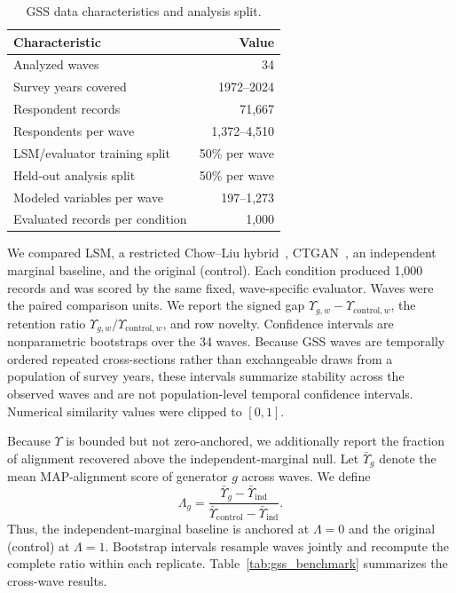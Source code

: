 \documentclass[runningheads]{llncs}
\begin{document}
\begin{table}[t]
\centering
\caption{GSS data characteristics and analysis split.}
\label{tab:gss_data}
\small
\setlength{\tabcolsep}{3.5pt}
\begin{tabular}{@{}lr@{}}
\toprule
Characteristic & Value \\
\midrule
Analyzed waves & 34 \\
Survey years covered & 1972--2024 \\
Respondent records & 71,667 \\
Respondents per wave & 1,372--4,510 \\
LSM/evaluator training split & 50\% per wave \\
Held-out analysis split & 50\% per wave \\
Modeled variables per wave & 197--1,273 \\
Evaluated records per condition & 1,000 \\
\bottomrule
\end{tabular}
\end{table}

We compared LSM, a restricted Chow--Liu hybrid~\cite{chow1968},
CTGAN~\cite{xu2019ctgan}, an independent marginal baseline, and the original
(control). Each condition produced 1,000 records and
was scored by the same fixed, wave-specific evaluator. Waves were the paired
comparison units. We report the signed gap
$\Upsilon_{g,w}-\Upsilon_{\mathrm{control},w}$, the retention ratio
$\Upsilon_{g,w}/\Upsilon_{\mathrm{control},w}$, and row novelty. Confidence
intervals are nonparametric bootstraps over the 34 waves. Because GSS waves are
temporally ordered repeated cross-sections rather than exchangeable draws from a
population of survey years, these intervals summarize stability across the
observed waves and are not population-level temporal confidence intervals.
Numerical similarity values were clipped to $[0,1]$.

Because $\Upsilon$ is bounded but not zero-anchored, we additionally report the
fraction of alignment recovered above the independent-marginal null. Let
$\bar{\Upsilon}_g$ denote the mean MAP-alignment score of generator $g$ across
waves. We define
\begin{equation}
\Lambda_g
=
\frac{\bar{\Upsilon}_g-\bar{\Upsilon}_{\mathrm{ind}}}
{\bar{\Upsilon}_{\mathrm{control}}-\bar{\Upsilon}_{\mathrm{ind}}}.
\label{eq:excess_alignment}
\end{equation}
Thus, the independent-marginal baseline is anchored at $\Lambda=0$ and the
original (control) at $\Lambda=1$. Bootstrap intervals resample waves jointly
and recompute the complete ratio within each replicate. Table~\ref{tab:gss_benchmark}
summarizes the cross-wave results.
\end{document}
